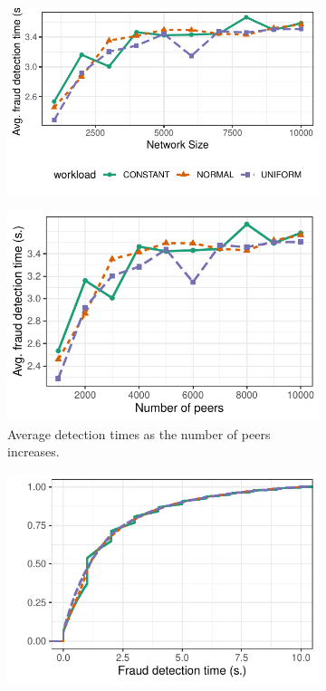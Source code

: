 \begin{figure}[!t]
	\centering
	\begin{subfigure}{.8\columnwidth}
		\centering
		\includegraphics[width=.8\linewidth]{trustchain/assets/workloads_experiments_legend}
	\end{subfigure}
	\begin{subfigure}{.5\columnwidth}
		\centering
		\captionsetup{width=.9\linewidth}
		\includegraphics[width=\linewidth]{trustchain/assets/fraud_times_workloads}
		\caption{Average detection times as the number of peers increases.}
		\label{fig:workloads_experiment_fraud_detection_times}
	\end{subfigure}%
	\begin{subfigure}{.5\columnwidth}
		\centering
		\captionsetup{width=.9\linewidth}
		\includegraphics[width=\columnwidth]{trustchain/assets/fraud_times_workloads_5000_ecdf}

\end{subfigure}
\end{figure}
